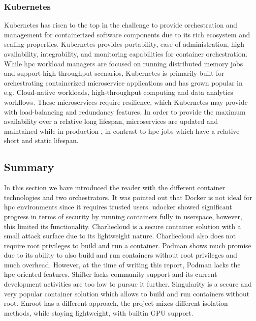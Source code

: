 \documentclass[conference]{IEEEtran}
\begin{document}
\subsubsection{Kubernetes}
Kubernetes has risen to the top in the challenge to provide orchestration and management for containerized software components due to its rich ecosystem and scaling properties. Kubernetes provides portability, ease of administration, high availability, integrability, and monitoring capabilities for container orchestration. While \gls{hpc} workload managers are focused on running distributed memory jobs and support high-throughput scenarios, Kubernetes is primarily built for orchestrating containerized microservice applications and has grown popular in e.g. Cloud-native workloads, high-throughput computing and data analytics workflows. These microservices require resilience, which Kubernetes may provide with load-balancing and redundancy features. In order to provide the maximum availability over a relative long lifespan,  microservices are updated and maintained while in production \cite{hpc-kubernetes-containers}, in contrast to \gls{hpc} jobs which have a relative short and static lifespan.







\subsection{Summary}
In this section we have introduced the reader with the different container technologies and two orchestrators. It was pointed out that Docker is not ideal for \gls{hpc} environments since it requires trusted users. udocker showed significant progress in terms of security by running containers fully in userspace, however, this limited its functionality. Charliecloud is a secure container solution with a small attack surface due to its lightweight nature. Charliecloud also does not require root privileges to build and run a container. Podman shows much promise due to its ability to also build and run containers without root privileges and much overhead. However, at the time of writing this report, Podman lacks the \gls{hpc} oriented features. Shifter lacks community support and its current development activities are too low to pursue it further. Singularity is a secure and very popular container solution which allows to build and run containers without root. Enroot has a different approach, the project mixes different isolation methods, while staying lightweight, with builtin GPU support.
\end{document}
